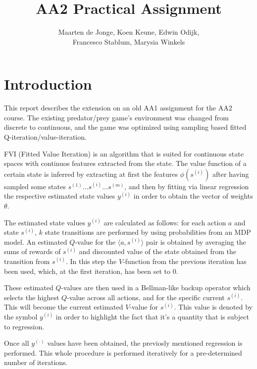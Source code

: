 \documentclass[a4paper, 12pt]{article}
\begin{document}
\title{AA2 Practical Assignment}
\author{Maarten de Jonge, Koen Keune, Edwin Odijk,\\ Francesco Stablum, Marysia Winkels}
\maketitle

\section*{Introduction}
This report describes the extension on an old AA1 assignment for the AA2 course. The existing predator/prey game's environment was changed from discrete to continuous, and the game was optimized using sampling based fitted Q-iteration/value-iteration.%

FVI (Fitted Value Iteration) is an algorithm that is suited for
continuous state spaces with continuos features extracted from
the state. 
The value function of a certain state is inferred by
extracting at first the features $\phi(s^{(i)})$ 
after having sampled some states 
$s^{(1)}\ldots s^{(i)} \ldots s^{(m)}$, 
and then by fitting via linear regression
the respective estimated state values $y^{(i)}$ 
in order to obtain the vector
of weights $\theta$.

The estimated state values $y^{(i)}$ are calculated as follows:
for each action $a$ and state $s^{(i)}$, 
$k$ state transitions are performed by using probabilities from 
an MDP model.
An estimated $Q$-value for the $\langle a,s^{(i)}\rangle$ pair is obtained
by averaging the sums of rewards of $s^{(i)}$ and
discounted value of the
state obtained from the transition from $s^{(i)}$.
In this step the $V$-function from the previous iteration has been used,
which, at the first iteration, has been set to 0.

These estimated $Q$-values are then used in a Bellman-like 
backup operator which selects the highest $Q$-value across all actions,
and for the specific current $s^{(i)}$.
This will become the current estimated $V$-value for $s^{(i)}$. 
This value is denoted
by the symbol $y^{(i)}$ in order to highlight the fact that it's 
a quantity that is subject to regression.

Once all $y^{(\cdot)}$ values have been obtained,
the previosly mentioned regression is performed.
This whole procedure is performed iteratively for a pre-determined
number of iterations.
\end{document}
